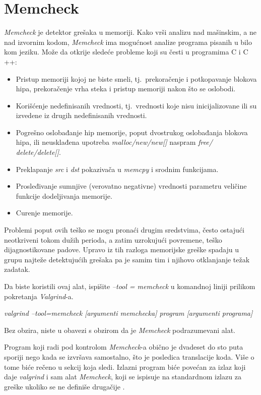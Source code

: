 \documentclass[12pt,oneside]{memoir}
\theoremstyle{plain}
\theoremstyle{definition}
\begin{document}
\section{Memcheck}
\textit{Memcheck} je detektor grešaka u memoriji. Kako vrši analizu nad mašinskim, a ne nad izvornim kodom, \textit{Memcheck} ima mogućnost analize programa pisanih u bilo kom jeziku. Može da otkrije sledeće probleme koji su česti u programima C i C ++:
\begin{itemize}
\item Pristup memoriji kojoj ne biste smeli, tj.~prekoračenje i potkopavanje blokova hipa, prekoračenje vrha steka i pristup memoriji nakon što se oslobodi.
\item Korišćenje nedefinisanih vrednosti, tj.~vrednosti koje nisu inicijalizovane ili su izvedene iz drugih nedefinisanih vrednosti.
\item Pogrešno oslobađanje hip memorije, poput dvostrukog oslobađanja blokova hipa, ili neusklađena upotreba \textit{malloc/new/new[]} naspram \textit{free/ delete/delete[]}.
\item Preklapanje \textit{src} i \textit{dst} pokazivača u \textit{memcpy} i srodnim funkcijama.
\item Prosleđivanje sumnjive (verovatno negativne) vrednosti parametru veličine funkcije dodeljivanja memorije.
\item Curenje memorije.
\end{itemize}

Problemi poput ovih teško se mogu pronaći drugim sredstvima, često ostajući neotkriveni tokom dužih perioda, a zatim uzrokujući povremene, teško dijagnostikovane padove. Upravo iz tih razloga memorijske greške spadaju u grupu najteže detektujućih grešaka pa je samim tim i njihovo otklanjanje težak zadatak.

Da biste koristili ovaj alat, ispišite \textit{--tool = memcheck} u komandnoj liniji prilikom pokretanja \textit{Valgrind}-a.
 \begin{center}
\textit{valgrind –tool=memcheck [argumenti memchecka] program [argumenti programa]}
\end{center}
Bez obzira, niste u obavezi s obzirom da je \textit{Memcheck} podrazumevani alat.

Program koji radi pod kontrolom \textit{Memcheck}-a obično je dvadeset do sto puta sporiji nego kada se izvršava samostalno, što je posledica translacije koda. Više o tome biće rečeno u sekcij koja sledi. Izlazni program biće povećan za izlaz koji daje \textit{valgrind} i sam alat \textit{Memcheck}, koji se ispisuje na standardnom izlazu za greške ukoliko se ne definiše drugačije \cite{Memcheck}. 
\end{document}
